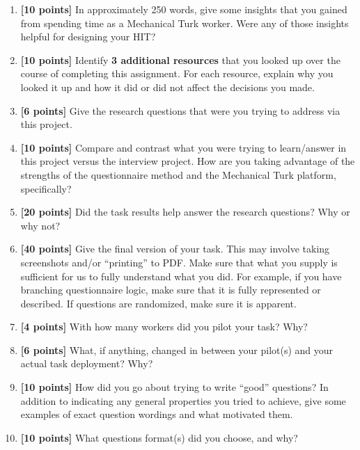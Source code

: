 \documentclass{article}
\begin{document}
\begin{enumerate}
    \item \textbf{[10 points]} In approximately 250 words, give some insights that you gained from spending time as a Mechanical Turk worker. Were any of those insights helpful for designing your HIT?

    \item \textbf{[10 points]} Identify \textbf{3 additional resources} that you looked up over the course of completing this assignment. For each resource, explain why you looked it up and how it did or did not affect the decisions you made.
    
    \item \textbf{[6 points]} Give the research questions that were you trying to address via this project.
    
    \item \textbf{[10 points]} Compare and contrast what you were trying to learn/answer in this project versus the interview project. How are you taking advantage of the strengths of the questionnaire method and the Mechanical Turk platform, specifically?
    
    \item \textbf{[20 points]} Did the task results help answer the research questions? Why or why not?
    
    \item \textbf{[40 points]} Give the final version of your task. This may involve taking screenshots and/or ``printing'' to PDF. Make sure that what you supply is sufficient for us to fully understand what you did. For example, if you have branching questionnaire logic, make sure that it is fully represented or described. If questions are randomized, make sure it is apparent.
    
    \item \textbf{[4 points]} With how many workers did you pilot your task? Why?

    \item \textbf{[6 points]} What, if anything, changed in between your pilot(s) and your actual task deployment? Why?
    
    \item \textbf{[10 points]} How did you go about trying to write ``good'' questions? In addition to indicating any general properties you tried to achieve, give some examples of exact question wordings and what motivated them.
    
    \item \textbf{[10 points]} What questions format(s) did you choose, and why?


\end{enumerate}
\end{document}
